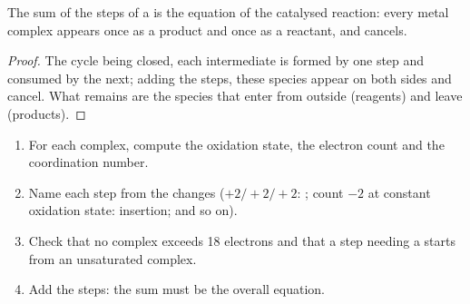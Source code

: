 \begin{proposition}\label{prop:b2:catalytic-cycles:cycle-sum}
The sum of the steps of a  is the equation of the catalysed reaction:
every metal complex appears once as a product and once as a reactant, and cancels.
\end{proposition}

\begin{proof}
The cycle being closed, each intermediate is formed by one step and consumed by the next;
adding the steps, these species appear on both sides and cancel. What remains are the
species that enter from outside (reagents) and leave (products).
\end{proof}

\begin{method}\label{met:b2:catalytic-cycles:read-cycle}
\begin{enumerate}
  \item For each complex, compute the oxidation state, the electron count and the
        coordination number.
  \item Name each step from the changes ($+2/+2/+2$: ; count $-2$ at
        constant oxidation state: insertion; and so on).
  \item Check that no complex exceeds 18 electrons and that a step needing a 
        starts from an unsaturated complex.
  \item Add the steps: the sum must be the overall equation.
\end{enumerate}
\end{method}

